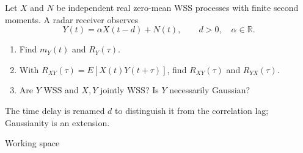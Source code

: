 \documentclass[11pt]{article}
\begin{document}
\begin{tcolorbox}[colback=qbg,colframe=qbg,boxrule=0pt]Let $X$ and $N$ be independent real zero-mean WSS processes with finite second moments. A radar receiver observes
\[Y(t)=\alpha X(t-d)+N(t),\qquad d>0,\quad\alpha\in\mathbb R.\]
\begin{enumerate}\item Find $m_Y(t)$ and $R_Y(\tau)$.\item With $R_{XY}(\tau)=E[X(t)Y(t+\tau)]$, find $R_{XY}(\tau)$ and $R_{YX}(\tau)$.\item Are $Y$ WSS and $X,Y$ jointly WSS? Is $Y$ necessarily Gaussian?\end{enumerate}
The time delay is renamed $d$ to distinguish it from the correlation lag; Gaussianity is an extension.
\end{tcolorbox}\smallskip\begin{workspace}\hfill{\color{linec}\footnotesize Working space}\end{workspace}
\end{document}
